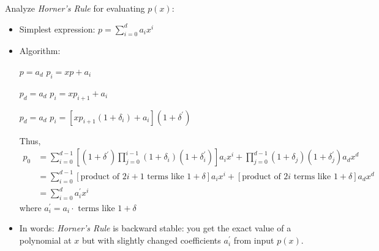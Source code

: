 \documentclass[11pt]{article}
\numberwithin{equation}{section}
\begin{document}
Analyze \textit{Horner's Rule} for evaluating $p(x)$: \begin{itemize}
    \item Simplest expression: $p = \sum_{i=0}^d a_i x^i$
    \item Algorithm: \begin{algorithmfrm}
        \begin{algorithmic}[1]
            \State $p = a_d$
                \State $p_i = x p + a_i$
                \EndFor
        \end{algorithmic}
    \end{algorithmfrm}
    \begin{algorithmfrm}
        \begin{algorithmic}[1]
            \State $p_d = a_d$
                \State $p_i = x p_{i+1} + a_i$
                \EndFor
        \end{algorithmic}
    \end{algorithmfrm}
    \begin{algorithmfrm}
        \begin{algorithmic}[1]
            \State $p_d = a_d$
                \State $p_i = [x p_{i+1}(1+\delta_i) + a_i](1+\delta^\prime)$
                \EndFor
        \end{algorithmic}
    \end{algorithmfrm}
    Thus, \begin{align*}
        p_0 &= \sum_{i=0}^{d-1}\left[ (1+\delta^\prime) \prod_{j=0}^{i-1} (1+\delta_i)(1+\delta_i^\prime) \right]a_i x^i + \prod_{j=0}^{d-1}(1+\delta_j)(1+\delta_j^\prime)a_d x^d \\
        &= \sum_{i=0}^{d-1} \left[ \text{product of }2i+1 \text{ terms like }1+\delta \right] a_i x^i + \left[ \text{product of }2i \text{ terms like }1+\delta \right] a_d x^d \\
        &= \sum_{i=0}^{d} a_i^\prime x^i
    \end{align*}
    where $a^\prime_i = a_i \cdot \text{ terms like }1+\delta$
    \item In words: \textit{Horner's Rule} is backward stable: you get the exact value of a polynomial at $x$ but with slightly changed coefficients $a_i^\prime$ from input $p(x)$.
\end{itemize}
\end{document}
